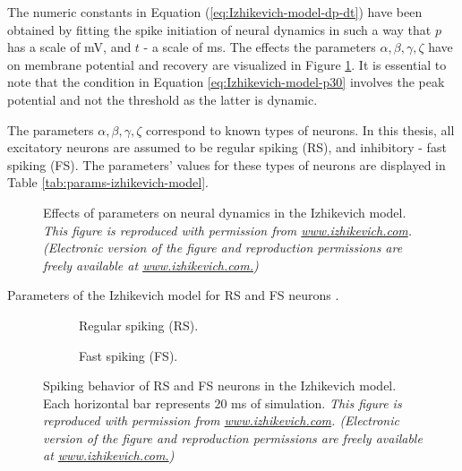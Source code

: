 The numeric constants in Equation (\ref{eq:Izhikevich-model-dp-dt}) have been obtained by fitting the spike initiation of neural dynamics in such a way that $p$ has a scale of mV, and $t$ - a scale of ms.
The effects the parameters $\alpha, \beta, \gamma, \zeta$ have on membrane potential and recovery are visualized in Figure \ref{fig:neural-dynamics}. It is essential to note that the condition in Equation \ref{eq:Izhikevich-model-p30} involves the peak potential and not the threshold as the latter is dynamic. 

The parameters $\alpha, \beta, \gamma, \zeta$ correspond to known types of neurons. In this thesis, all excitatory neurons are assumed to be regular spiking (RS), and inhibitory - fast spiking (FS). 
The parameters' values for these types of neurons  are displayed in Table \ref{tab:params-izhikevich-model}.



\begin{figure}[!htp]
    \centering
    
    \caption[Effects of parameters on neural dynamics, Izhikevich model]{Effects of parameters on neural dynamics in the Izhikevich model. {\it This figure is reproduced with permission from \url{www.izhikevich.com}. (Electronic version of the figure and reproduction permissions are freely available at \url{www.izhikevich.com.})}}
    \label{fig:neural-dynamics}
\end{figure}

\begin{table}[!htp] 
    \centering
    
    \caption[Parameters for RS and FS neurons, Izhikevich model]{Parameters of the Izhikevich model for RS and FS neurons \cite{Izhikevich2003}.}
\label{tab:params-izhikevich-model}
\end{table}


\begin{figure}[!htp]
    \hspace*{-1.5cm} 
    \centering
    \begin{subfigure}[t]{0.3\textwidth}
        \centering
        
        \caption{Regular spiking (RS).}
        \label{fig:neuron-types-rs}
    \end{subfigure}
    \hspace{0.1\textwidth}
    \begin{subfigure}[t]{0.3\textwidth}
        \centering
        
        \caption{Fast spiking (FS).}
        \label{fig:neuron-types-fs}
    \end{subfigure}
    \caption[RS and FS neurons, Izhikevich model]{Spiking behavior of RS and FS neurons in the Izhikevich model. Each horizontal bar represents 20 ms of simulation. {\it This figure is reproduced with permission from \url{www.izhikevich.com}. (Electronic version of the figure and reproduction permissions are freely available at \url{www.izhikevich.com.})}}
    \label{fig:neuron-types}
\end{figure}

